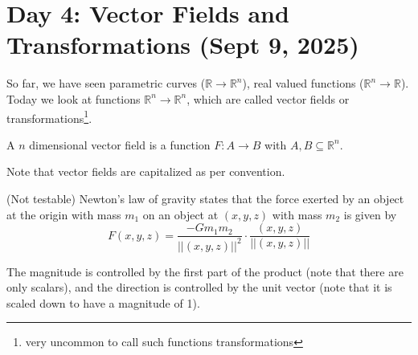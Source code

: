 \section{Day 4: Vector Fields and Transformations (Sept 9, 2025)}

So far, we have seen parametric curves ($\mathbb{R} \to \mathbb{R}^n$), real valued functions ($\mathbb{R}^n \to \mathbb{R}$). Today we look at functions $\mathbb{R}^n \to \mathbb{R}^n$, which are called vector fields or transformations\footnote{very uncommon to call such functions transformations}.

\begin{definition}
A $n$ dimensional vector field is a function $F: A \to B$ with $A, B \subseteq \mathbb{R}^n$.
\end{definition}

Note that vector fields are capitalized as per convention. 

(Not testable) Newton's law of gravity states that the force exerted by an object at the origin with mass $m_1$ on an object at $(x, y, z)$ with mass $m_2$ is given by
\[
F(x, y, z) = \frac{-Gm_1m_2}{||(x,y,z)||^2} \cdot \frac{(x, y, z)}{||(x, y, z)||}
\]

The magnitude is controlled by the first part of the product (note that there are only scalars), and the direction is controlled by the unit vector (note that it is scaled down to have a magnitude of 1).
